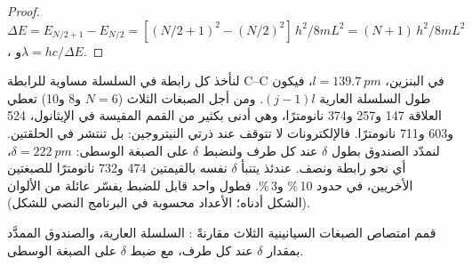 \begin{proof}
$\Delta E = E_{N/2+1} - E_{N/2} = [(N/2+1)^2 - (N/2)^2]\,h^2/8mL^2 =
(N+1)\,h^2/8mL^2$، و$\lambda = hc/\Delta E$.
\end{proof}

\begin{example}\label{ex:b3:quantum-model-systems:dyes}
لنأخذ كل رابطة في السلسلة مساوية للرابطة C--C في البنزين،
$l = \qty{139.7}{pm}$، فيكون طول السلسلة العارية $(j - 1)l$. ومن أجل
الصبغات الثلاث ($N = 6$ و8 و10) تعطي العلاقة 147 و257 و374 نانومترًا، وهي
أدنى بكثير من القمم المقيسة في الإيثانول، 524 و603 و711 نانومترًا. فالإلكترونات
لا تتوقف عند ذرتي النيتروجين: بل تنتشر في الحلقتين. لنمدّد
الصندوق بطول $\delta$ عند كل طرف ولنضبط $\delta$ على الصبغة الوسطى:
$\delta = \qty{222}{pm}$، أي نحو رابطة ونصف. عندئذ يتنبأ $\delta$ نفسه
بالقيمتين 474 و732 نانومترًا للصبغتين الأخريين، في حدود 10\,\% و3\,\%. فطول
واحد قابل للضبط يفسّر عائلة من الألوان (الشكل أدناه؛ الأعداد
محسوبة في البرنامج النصي للشكل).
\end{example}

\begin{omfigure}

{\small قمم امتصاص الصبغات السيانينية الثلاث مقارنةً : السلسلة العارية، والصندوق الممدَّد بمقدار $\delta$ عند
كل طرف، مع ضبط $\delta$ على الصبغة الوسطى.}
\end{omfigure}

